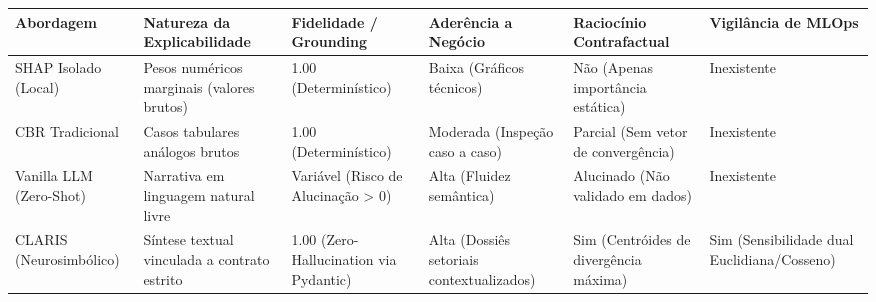 \begin{tabular}{llllll}
\toprule
Abordagem & Natureza da Explicabilidade & Fidelidade / Grounding & Aderência a Negócio & Raciocínio Contrafactual & Vigilância de MLOps \\
\midrule
SHAP Isolado (Local) & Pesos numéricos marginais (valores brutos) & 1.00 (Determinístico) & Baixa (Gráficos técnicos) & Não (Apenas importância estática) & Inexistente \\
CBR Tradicional & Casos tabulares análogos brutos & 1.00 (Determinístico) & Moderada (Inspeção caso a caso) & Parcial (Sem vetor de convergência) & Inexistente \\
Vanilla LLM (Zero-Shot) & Narrativa em linguagem natural livre & Variável (Risco de Alucinação > 0) & Alta (Fluidez semântica) & Alucinado (Não validado em dados) & Inexistente \\
CLARIS (Neurosimbólico) & Síntese textual vinculada a contrato estrito & 1.00 (Zero-Hallucination via Pydantic) & Alta (Dossiês setoriais contextualizados) & Sim (Centróides de divergência máxima) & Sim (Sensibilidade dual Euclidiana/Cosseno) \\
\bottomrule
\end{tabular}

